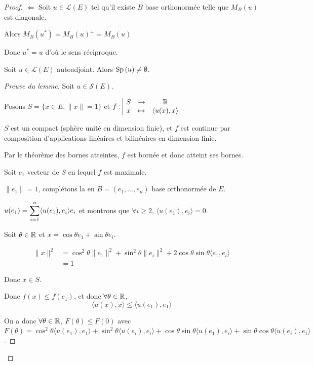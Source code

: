 \begin{proof}
    $\Leftarrow$ Soit $u \in \mathscr L(E)$ tel qu'il existe $B$ base orthonormée 
    telle que $M_B(u)$ est diagonale. 

    Alors $M_B(u^*) = M_B(u)^\perp = M_B(u)$

    Donc $u^* = u$ d'où le sens réciproque. 

     Soit $u \in \mathscr L(E)$ autoadjoint. Alors 
    $\operatorname{Sp} \,(u) \neq \emptyset$. 

    \avspace 

    \begin{proof}[Preuve du lemme]
    Soit $u \in \mathscr S(E)$. 

    Posons $S = \{x \in E, \| x \| = 1\}$ et 
    $f: \space \begin{array}{|ccc} \displaystyle S & \to & \displaystyle \mathbb{R} \\ \displaystyle x & \mapsto & \displaystyle \langle u(x), x \rangle \end{array}$

    $S$ est un compact (sphère unité en dimension finie), et $f$ est 
    continue par composition d'applications linéaires et bilinéaires en dimension finie. 

    Par le théorème des bornes atteintes, $f$ est bornée et donc atteint ses bornes. 

    Soit $e_1$ vecteur de $S$ en lequel $f$ est maximale. 

    $\| e_1 \| = 1$, complétons la en $B = (e_1, \dots, e_n)$ base orthonormée de $E$.

    $u(e_1) = \displaystyle \sum_{i = 1}^{n } \langle u(e_1), e_i \rangle e_i$ et 
    montrons que $\forall i \geqslant 2, \, \langle u(e_1), e_i \rangle = 0$.

    Soit $\theta \in \mathbb{R}$ et $x = \cos \theta e_1 + \sin \theta e_i$. 

    \begin{align}
        \| x \|^2 & = \cos^2 \theta \| e_1 \|^2 + \sin^2 \theta \| e_i \|^2 + 2 \cos \theta \sin \theta \langle e_1, e_i \rangle \\
        & = 1
    \end{align} 

    Donc $x \in S$. 

    Donc $f(x) \leqslant f(e_1)$, et donc $\forall \theta \in \mathbb{R}$, 
    $$\langle u (x), x \rangle \leqslant \langle u(e_1), e_1 \rangle$$

    On a donc $\forall \theta \in \mathbb{R}$, $F(\theta) \leqslant F(0)$ avec 
    $F(\theta) = \cos^2 \theta \langle u(e_1), e_1 \rangle + \sin^2 \theta \langle u(e_i), e_i \rangle + \cos \theta \sin \theta \langle u(e_1), e_i \rangle + \sin \theta \cos \theta \langle u(e_i), e_1 \rangle$.


\end{proof}
\end{proof}
